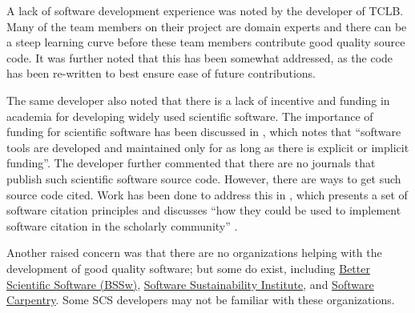 \documentclass[12pt, notitlepage]{article}
\begin{document}
A lack of software development experience was noted by the developer of TCLB. Many of the team members on their project are domain experts and there can be a steep learning curve before these team members contribute good quality source code. It was further noted that this has been somewhat addressed, as the code has been re-written to best ensure ease of future contributions. 

The same developer also noted that there is a lack of incentive and funding in academia for developing widely used scientific software. The importance of funding for scientific software has been discussed in \cite{gewaltig2012quality}, which notes that ``software tools are developed and maintained only for as long as there is explicit or implicit funding''. The developer further commented that there are no journals that publish such scientific software source code. However, there are ways to get such source code cited. Work has been done to address this in \citep{smith2016software}, which presents a set of software citation principles and discusses ``how they could be used to implement software citation in the scholarly community'' \citep{katz2019software}. 

Another raised concern was that there are no organizations helping with the development of good quality software; but some do exist, including \href{https://bssw.io/}{Better Scientific Software (BSSw)}, \href{https://www.software.ac.uk/}{Software Sustainability Institute}, and \href{https://software-carpentry.org/}{Software Carpentry}. Some SCS developers may not be familiar with these organizations. 
\end{document}
